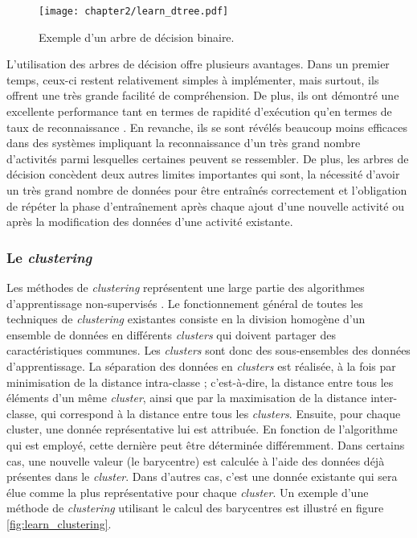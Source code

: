 \begin{figure}[H]
	\centering
	\texttt{[image: chapter2/learn\_dtree.pdf]}
	\caption{Exemple d'un arbre de décision binaire.}
	\label{fig:learn_dtree}
\end{figure}

L'utilisation des arbres de décision offre plusieurs avantages. Dans un premier temps, ceux-ci restent relativement simples à implémenter, mais surtout, ils offrent une très grande facilité de compréhension. De plus, ils ont démontré une excellente performance tant en termes de rapidité d'exécution qu'en termes de taux de reconnaissance \citep{Bao2004}. En revanche, ils se sont révélés beaucoup moins efficaces dans des systèmes impliquant la reconnaissance d'un très grand nombre d'activités parmi lesquelles certaines peuvent se ressembler. De plus, les arbres de décision concèdent deux autres limites importantes qui sont, la nécessité d'avoir un très grand nombre de données pour être entraînés correctement et l'obligation de répéter la phase d'entraînement après chaque ajout d'une nouvelle activité ou après la modification des données d'une activité existante.

\subsubsection{Le \textit{clustering}}

Les méthodes de \textit{clustering} représentent une large partie des algorithmes d'apprentissage non-supervisés \citep{Witten2016}. Le fonctionnement général de toutes les techniques de \textit{clustering} existantes consiste en la division homogène d'un ensemble de données en différents \textit{clusters} qui doivent partager des caractéristiques communes. Les \textit{clusters} sont donc des sous-ensembles des données d'apprentissage. La séparation des données en \textit{clusters} est réalisée, à la fois par minimisation de la distance intra-classe ; c'est-à-dire, la distance entre tous les éléments d'un même \textit{cluster}, ainsi que par la maximisation de la distance inter-classe, qui correspond à la distance entre tous les \textit{clusters}. Ensuite, pour chaque cluster, une donnée représentative lui est attribuée. En fonction de l'algorithme qui est employé, cette dernière peut être déterminée différemment. Dans certains cas, une nouvelle valeur (le barycentre) est calculée à l'aide des données déjà présentes dans le \textit{cluster}. Dans d'autres cas, c'est une donnée existante qui sera élue comme la plus représentative pour chaque \textit{cluster}. Un exemple d'une méthode de \textit{clustering} utilisant le calcul des barycentres est illustré en figure \ref{fig:learn_clustering}.

